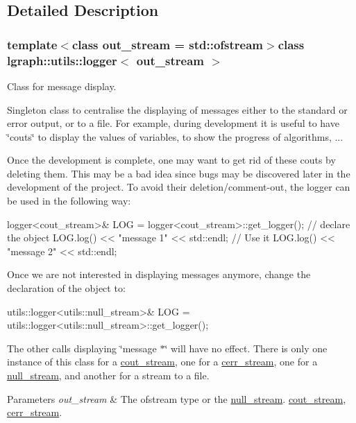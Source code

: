 \subsection{Detailed Description}
\subsubsection*{template$<$class out\-\_\-stream = std\-::ofstream$>$class lgraph\-::utils\-::logger$<$ out\-\_\-stream $>$}

Class for message display. 

Singleton class to centralise the displaying of messages either to the standard or error output, or to a file. For example, during development it is useful to have \char`\"{}couts\char`\"{} to display the values of variables, to show the progress of algorithms, ...

Once the development is complete, one may want to get rid of these couts by deleting them. This may be a bad idea since bugs may be discovered later in the development of the project. To avoid their deletion/comment-\/out, the logger can be used in the following way\-: \begin{DoxyVerb}logger<cout_stream>& LOG = logger<cout_stream>::get_logger();   // declare the object\n
LOG.log() << "message 1" << std::endl;  // Use it   \n
LOG.log() << "message 2" << std::endl;              \n\n
\end{DoxyVerb}


Once we are not interested in displaying messages anymore, change the declaration of the object to\-: \begin{DoxyVerb}utils::logger<utils::null_stream>& LOG =
    utils::logger<utils::null_stream>::get_logger();
\end{DoxyVerb}


The other calls displaying \char`\"{}message $\ast$\char`\"{} will have no effect. There is only one instance of this class for a \hyperlink{classlgraph_1_1utils_1_1cout__stream}{cout\-\_\-stream}, one for a \hyperlink{classlgraph_1_1utils_1_1cerr__stream}{cerr\-\_\-stream}, one for a \hyperlink{classlgraph_1_1utils_1_1null__stream}{null\-\_\-stream}, and another for a stream to a file.


\begin{DoxyParams}{Parameters}
{\em out\-\_\-stream} & The ofstream type or the \hyperlink{classlgraph_1_1utils_1_1null__stream}{null\-\_\-stream}. \hyperlink{classlgraph_1_1utils_1_1cout__stream}{cout\-\_\-stream}, \hyperlink{classlgraph_1_1utils_1_1cerr__stream}{cerr\-\_\-stream}. \\
\hline
\end{DoxyParams}


